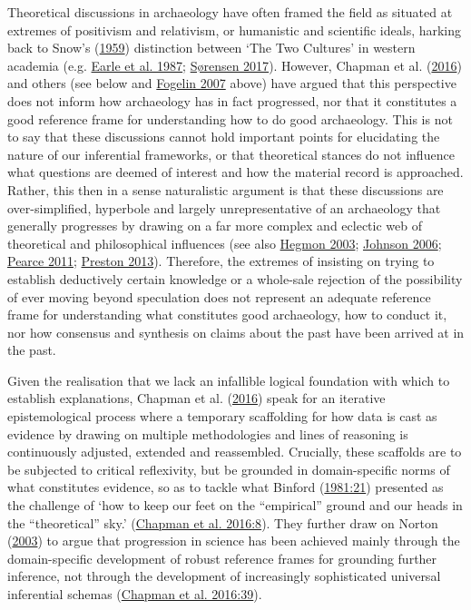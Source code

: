\documentclass[
  a4paper,
  oneside]{uiophdthesis}
\begin{document}
Theoretical discussions in archaeology have often framed the field as situated at extremes of positivism and relativism, or humanistic and scientific ideals, harking back to Snow's (\protect\hyperlink{ref-snow1959}{1959}) distinction between `The Two Cultures' in western academia (e.g. \protect\hyperlink{ref-earle1987}{Earle et al. 1987}; \protect\hyperlink{ref-suxf8rensen2017}{Sørensen 2017}). However, Chapman et al. (\protect\hyperlink{ref-chapman2016}{2016}) and others (see below and \protect\hyperlink{ref-fogelin2007}{Fogelin 2007} above) have argued that this perspective does not inform how archaeology has in fact progressed, nor that it constitutes a good reference frame for understanding how to do good archaeology. This is not to say that these discussions cannot hold important points for elucidating the nature of our inferential frameworks, or that theoretical stances do not influence what questions are deemed of interest and how the material record is approached. Rather, this then in a sense naturalistic argument is that these discussions are over-simplified, hyperbole and largely unrepresentative of an archaeology that generally progresses by drawing on a far more complex and eclectic web of theoretical and philosophical influences (see also \protect\hyperlink{ref-hegmon2003}{Hegmon 2003}; \protect\hyperlink{ref-johnson2006}{Johnson 2006}; \protect\hyperlink{ref-pearce2011}{Pearce 2011}; \protect\hyperlink{ref-preston2013}{Preston 2013}). Therefore, the extremes of insisting on trying to establish deductively certain knowledge or a whole-sale rejection of the possibility of ever moving beyond speculation does not represent an adequate reference frame for understanding what constitutes good archaeology, how to conduct it, nor how consensus and synthesis on claims about the past have been arrived at in the past.

Given the realisation that we lack an infallible logical foundation with which to establish explanations, Chapman et al. (\protect\hyperlink{ref-chapman2016}{2016}) speak for an iterative epistemological process where a temporary scaffolding for how data is cast as evidence by drawing on multiple methodologies and lines of reasoning is continuously adjusted, extended and reassembled. Crucially, these scaffolds are to be subjected to critical reflexivity, but be grounded in domain-specific norms of what constitutes evidence, so as to tackle what Binford (\protect\hyperlink{ref-binford1981}{1981:21}) presented as the challenge of `how to keep our feet on the ``empirical'' ground and our heads in the ``theoretical'' sky.' (\protect\hyperlink{ref-chapman2016}{Chapman et al. 2016:8}). They further draw on Norton (\protect\hyperlink{ref-norton2003}{2003}) to argue that progression in science has been achieved mainly through the domain-specific development of robust reference frames for grounding further inference, not through the development of increasingly sophisticated universal inferential schemas (\protect\hyperlink{ref-chapman2016}{Chapman et al. 2016:39}).
\end{document}
